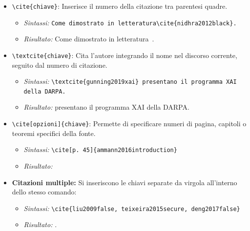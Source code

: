 \begin{itemize}
    \item \texttt{\textbackslash cite\{chiave\}}: Inserisce il numero della citazione tra parentesi quadre.
    \begin{itemize}
        \item \textit{Sintassi:} \texttt{Come dimostrato in letteratura\textbackslash cite\{nidhra2012black\}.}
        \item \textit{Risultato:} Come dimostrato in letteratura~\cite{nidhra2012black}.
    \end{itemize}
    \item \texttt{\textbackslash textcite\{chiave\}}: Cita l'autore integrando il nome nel discorso corrente, seguito dal numero di citazione.
    \begin{itemize}
        \item \textit{Sintassi:} \texttt{\textbackslash textcite\{gunning2019xai\} presentano il programma XAI della DARPA.}
        \item \textit{Risultato:} \textcite{gunning2019xai} presentano il programma XAI della DARPA.
    \end{itemize}
    \item \texttt{\textbackslash cite[opzioni]\{chiave\}}: Permette di specificare numeri di pagina, capitoli o teoremi specifici della fonte.
    \begin{itemize}
        \item \textit{Sintassi:} \texttt{\textbackslash cite[p.~45]\{ammann2016introduction\}}
        \item \textit{Risultato:} \cite[p.~45]{ammann2016introduction}
    \end{itemize}
    \item \textbf{Citazioni multiple:} Si inseriscono le chiavi separate da virgola all'interno dello stesso comando:
    \begin{itemize}
        \item \textit{Sintassi:} \texttt{\textbackslash cite\{liu2009false, teixeira2015secure, deng2017false\}}
        \item \textit{Risultato:} \cite{liu2009false, teixeira2015secure, deng2017false}.
    \end{itemize}
\end{itemize}

